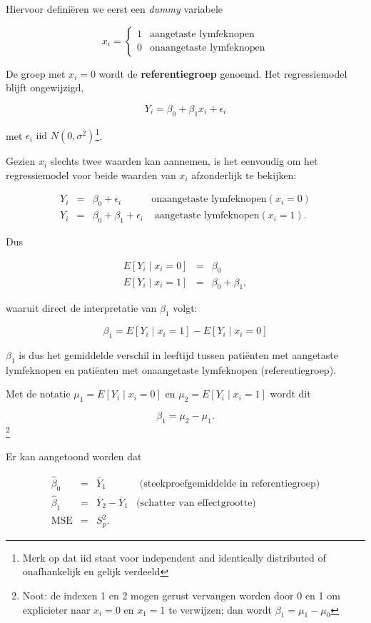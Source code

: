 \documentclass[
  12pt,dutch,coursenotes]{book}
\theoremstyle{definition}
\theoremstyle{definition}
\theoremstyle{definition}
\theoremstyle{definition}
\theoremstyle{remark}
\begin{document}
Hiervoor definiëren we eerst een \emph{dummy} variabele

\[x_i = \left\{ \begin{array}{ll}
1 & \text{aangetaste lymfeknopen} \\
0 & \text{onaangetaste lymfeknopen} \end{array}\right.\]

De groep met \(x_i=0\) wordt de \textbf{referentiegroep} genoemd.
Het regressiemodel blijft ongewijzigd,

\[Y_i = \beta_0 + \beta_1 x_i +\epsilon_i\]

met \(\epsilon_i \text{ iid } N(0,\sigma^2)\)\footnote{Merk op dat iid staat voor independent and identically distributed of onafhankelijk en gelijk verdeeld}.

Gezien \(x_i\) slechts twee waarden kan aannemen, is het eenvoudig om het regressiemodel voor beide waarden van \(x_i\) afzonderlijk te bekijken:

\[\begin{array}{lcll}
   Y_i &=& \beta_0 +\epsilon_i &\text{onaangetaste lymfeknopen} (x_i=0) \\
   Y_i &=& \beta_0 + \beta_1 +\epsilon_i &\text{ aangetaste lymfeknopen} (x_i=1) .
 \end{array}\]

Dus

\begin{eqnarray*}
   E\left[Y_i\mid x_i=0\right] &=& \beta_0 \\
   E\left[Y_i\mid x_i=1\right] &=& \beta_0 + \beta_1,
\end{eqnarray*}

waaruit direct de interpretatie van \(\beta_1\) volgt:

\[   \beta_1 = E\left[Y_i\mid x_i=1\right]-E\left[Y_i\mid x_i=0\right]\]

\(\beta_1\) is dus het gemiddelde verschil in leeftijd tussen patiënten met aangetaste lymfeknopen en patiënten met onaangetaste lymfeknopen (referentiegroep).

Met de notatie \(\mu_1= E\left[Y_i\mid x_i=0\right]\) en \(\mu_2= E\left[Y_i\mid x_i=1\right]\) wordt dit

\[\beta_1 = \mu_2-\mu_1.\]\footnote{Noot: de indexen 1 en 2 mogen gerust vervangen worden door 0 en 1 om explicieter naar \(x_i=0\) en \(x_1=1\) te verwijzen; dan wordt \(\beta_1=\mu_1-\mu_0\)}

Er kan aangetoond worden dat

\[\begin{array}{ccll}
 \hat\beta_0
   &=& \bar{Y}_1&\text{ (steekproefgemiddelde in referentiegroep)} \\
 \hat\beta_1
   &=& \bar{Y}_2-\bar{Y}_1&\text{(schatter van effectgrootte)} \\
 \text{MSE}
   &=& S_p^2 .
\end{array}\]
\end{document}
